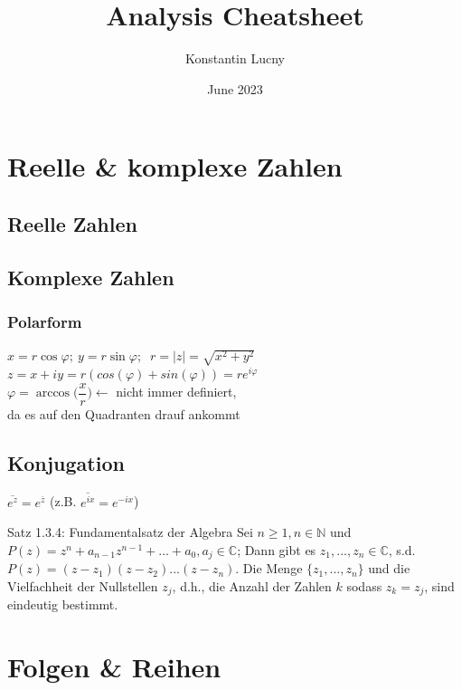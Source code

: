 \documentclass[a4paper,10pt]{article}
\title{Analysis Cheatsheet}
\author{Konstantin Lucny}
\date{June 2023}
\begin{document}



\section{Reelle \& komplexe Zahlen}
\subsection{Reelle Zahlen}

\subsection{Komplexe Zahlen}
\subsubsection{Polarform}
$ x = r\cos {\varphi};\ y=r\sin{\varphi};\  $ $r=|z|=\sqrt{x^2+y^2}$\\
$z=x+iy=r(cos(\varphi)+sin(\varphi))=re^{i\varphi} $\\
$\varphi=\arccos{\bigg(\dfrac{x}{r}\bigg)} \leftarrow$  nicht immer definiert,\\
da es auf den Quadranten drauf ankommt
\subsection{Konjugation}
$\overline{e^z}=e^{\overline{z}}$ (z.B. $\overline{e^{ix}}=e^{-ix}$)
\begin{tbox}
    {Satz 1.3.4: Fundamentalsatz der Algebra}
    Sei $n\ge 1, n\in \mathbb N$ und $P(z)=z^n+a_{n-1}z^{n-1}+...+a_0, a_j\in \mathbb C$; Dann gibt es $z_1,...,z_n \in \mathbb C$, s.d. $P(z)=(z-z_1)(z-z_2)...(z-z_n)$. Die Menge $\{z_1,...,z_n\}$ und die Vielfachheit der Nullstellen $z_j$, d.h., die Anzahl der Zahlen $k$ sodass $z_k=z_j$, sind eindeutig bestimmt.
\end{tbox}

\section{Folgen \& Reihen}
\end{document}

